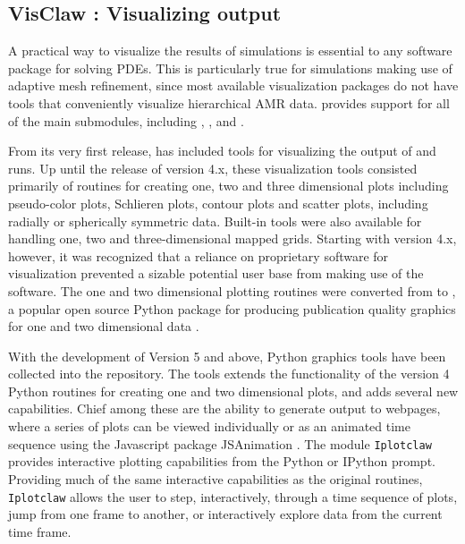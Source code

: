 %
%
%

\subsection{VisClaw : Visualizing \clawpack output}
A practical way to visualize the results of simulations is
essential to any software package for solving PDEs.
This is particularly true for simulations making use of adaptive mesh
refinement, since most available visualization packages do not
have tools that conveniently visualize hierarchical AMR data.  \visclaw provides 
support for all of the main \clawpack submodules, including
\classic, \amrclaw, \pyclaw and \geoclaw.

From its very first release,
\clawpack has included tools for visualizing the output of \clawpack and
\amrclaw runs.  Up until the release of version \clawpack 4.x, these
visualization tools consisted primarily of \mlab routines
for creating one, two and three dimensional plots including
pseudo-color plots, Schlieren plots, contour plots and scatter plots,
including  radially or spherically symmetric data. 
Built-in tools were also available
for handling one, two and three-dimensional mapped grids.
Starting with version 4.x, however, it was recognized that a reliance
on proprietary software for visualization prevented a sizable
potential user base from making use of the \clawpack software.
The one and two dimensional plotting
routines were converted from \mlab to \mplotlib,
a popular open source
Python package for producing publication quality graphics
for one and two dimensional data \cite{Hunter:2007}.

With the development of \clawpack Version 5 and above, Python graphics tools
have been collected into the \visclaw repository.
The \visclaw tools extends the
functionality of the version 4 Python routines for creating one and
two dimensional plots, and adds several new capabilities.  Chief among
these are the ability to generate output to webpages,
where a series of plots can be viewed individually or as an animated
time sequence using the Javascript package {\sc JSAnimation}
\cite{jsanimation}.
The \visclaw module {\tt Iplotclaw} provides
interactive plotting capabilities from the Python or IPython prompt.
Providing much of the same interactive capabilities as the original
\mlab routines, {\tt Iplotclaw} allows the user to step,
interactively, through a time sequence of plots, jump from one frame
to another, or interactively explore data from the current time frame.


